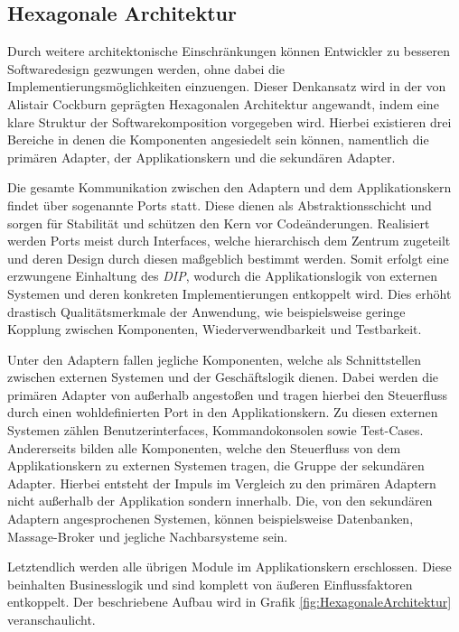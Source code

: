 \subsection{Hexagonale Architektur}


Durch weitere architektonische Einschränkungen können Entwickler zu besseren Softwaredesign gezwungen werden, ohne dabei die Implementierungsmöglichkeiten einzuengen. Dieser Denkansatz wird in der von Alistair Cockburn geprägten Hexagonalen Architektur angewandt, indem eine klare Struktur der Softwarekomposition vorgegeben wird. Hierbei existieren drei Bereiche in denen die Komponenten angesiedelt sein können, namentlich die primären Adapter, der Applikationskern und die sekundären Adapter. 

Die gesamte Kommunikation zwischen den Adaptern und dem Applikationskern findet über sogenannte Ports statt. Diese dienen als Abstraktionsschicht und sorgen für Stabilität und schützen den Kern vor Codeänderungen. Realisiert werden Ports meist durch Interfaces, welche hierarchisch dem Zentrum zugeteilt und deren Design durch diesen maßgeblich bestimmt werden. Somit erfolgt eine erzwungene Einhaltung des \emph{\acrlong{DIP}}, wodurch die Applikationslogik von externen Systemen und deren konkreten Implementierungen entkoppelt wird. Dies erhöht drastisch Qualitätsmerkmale der Anwendung, wie beispielsweise geringe Kopplung zwischen Komponenten, Wiederverwendbarkeit und Testbarkeit.

Unter den Adaptern fallen jegliche Komponenten, welche als Schnittstellen zwischen externen Systemen und der Geschäftslogik dienen. Dabei werden die primären Adapter von außerhalb angestoßen und tragen hierbei den Steuerfluss durch einen wohldefinierten Port in den Applikationskern. Zu diesen externen Systemen zählen Benutzerinterfaces, Kommandokonsolen sowie Test-Cases. Andererseits bilden alle Komponenten, welche den Steuerfluss von dem Applikationskern zu externen Systemen tragen, die Gruppe der sekundären Adapter. Hierbei entsteht der Impuls im Vergleich zu den primären Adaptern nicht außerhalb der Applikation sondern innerhalb. Die, von den sekundären Adaptern angesprochenen Systemen, können beispielsweise Datenbanken, Massage-Broker und jegliche Nachbarsysteme sein. 

Letztendlich werden alle übrigen Module im Applikationskern erschlossen. Diese beinhalten Businesslogik und sind komplett von äußeren Einflussfaktoren entkoppelt. Der beschriebene Aufbau wird in Grafik \ref{fig:HexagonaleArchitektur} veranschaulicht.

